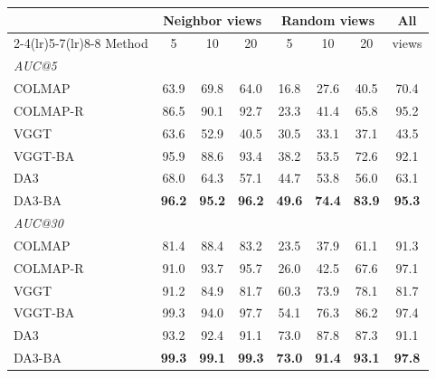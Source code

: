 \begin{tabular}{lccccccc}
\toprule
 & \multicolumn{3}{c}{Neighbor views} & \multicolumn{3}{c}{Random views} & All \\
\cmidrule(lr){2-4}\cmidrule(lr){5-7}\cmidrule(lr){8-8}
Method & 5 & 10 & 20 & 5 & 10 & 20 & views \\
\midrule
\multicolumn{8}{l}{\emph{AUC@5}} \\
COLMAP & 63.9 & 69.8 & 64.0 & 16.8 & 27.6 & 40.5 & 70.4 \\
COLMAP-R & 86.5 & 90.1 & 92.7 & 23.3 & 41.4 & 65.8 & 95.2 \\
VGGT & 63.6 & 52.9 & 40.5 & 30.5 & 33.1 & 37.1 & 43.5 \\
VGGT-BA & 95.9 & 88.6 & 93.4 & 38.2 & 53.5 & 72.6 & 92.1 \\
DA3 & 68.0 & 64.3 & 57.1 & 44.7 & 53.8 & 56.0 & 63.1 \\
DA3-BA & \textbf{96.2} & \textbf{95.2} & \textbf{96.2} & \textbf{49.6} & \textbf{74.4} & \textbf{83.9} & \textbf{95.3} \\
\midrule
\multicolumn{8}{l}{\emph{AUC@30}} \\
COLMAP & 81.4 & 88.4 & 83.2 & 23.5 & 37.9 & 61.1 & 91.3 \\
COLMAP-R & 91.0 & 93.7 & 95.7 & 26.0 & 42.5 & 67.6 & 97.1 \\
VGGT & 91.2 & 84.9 & 81.7 & 60.3 & 73.9 & 78.1 & 81.7 \\
VGGT-BA & 99.3 & 94.0 & 97.7 & 54.1 & 76.3 & 86.2 & 97.4 \\
DA3 & 93.2 & 92.4 & 91.1 & 73.0 & 87.8 & 87.3 & 91.1 \\
DA3-BA & \textbf{99.3} & \textbf{99.1} & \textbf{99.3} & \textbf{73.0} & \textbf{91.4} & \textbf{93.1} & \textbf{97.8} \\
\bottomrule
\end{tabular}
